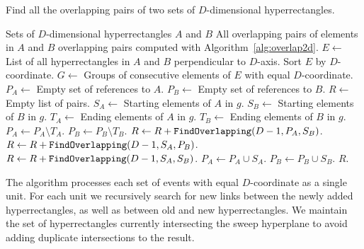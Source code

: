 \documentclass[english,gradu]{tktltiki2018}
\begin{document}
\begin{algorithm}
\caption{Find all the overlapping pairs of two sets of $D$-dimensional hyperrectangles.}
\label{alg:overlapdd}
\begin{algorithmic}
\Require Sets of $D$-dimensional hyperrectangles $A$ and $B$
\Ensure All overlapping pairs of elements in $A$ and $B$
		\State \Return overlapping pairs computed with Algorithm~\ref{alg:overlap2d}.
	\EndIf
	\State $E\gets$ List of all hyperrectangles in $A$ and $B$ perpendicular to $D$-axis.
	\State Sort $E$ by $D$-coordinate.
	\State $G\gets$ Groups of consecutive elements of $E$ with equal $D$-coordinate.
	\State $P_A\gets$ Empty set of references to $A$.
	\State $P_B\gets$ Empty set of references to $B$.
	\State $R\gets$ Empty list of pairs.
		\State $S_A\gets$ Starting elements of $A$ in $g$.
		\State $S_B\gets$ Starting elements of $B$ in $g$.
		\State $T_A\gets$ Ending elements of $A$ in $g$.
		\State $T_B\gets$ Ending elements of $B$ in $g$.
		\State $P_A\gets P_A\setminus T_A$.
		\State $P_B\gets P_B\setminus T_B$.
		\State $R\gets R + \texttt{FindOverlapping}(D-1,P_A,S_B)$.
		\State $R\gets R + \texttt{FindOverlapping}(D-1,S_A,P_B)$.
		\State $R\gets R + \texttt{FindOverlapping}(D-1,S_A,S_B)$.
		\State $P_A\gets P_A\cup S_A$.
		\State $P_B\gets P_B\cup S_B$.
	\EndFor
	\State \Return $R$.
\EndProcedure
\end{algorithmic}
\end{algorithm}

The algorithm processes each set of events with equal $D$-coordinate as a single unit.
For each unit we recursively search for new links between the newly added hyperrectangles, as well as between old and new hyperrectangles.
We maintain the set of hyperrectangles currently intersecting the sweep hyperplane to avoid adding duplicate intersections to the result.
\end{document}
